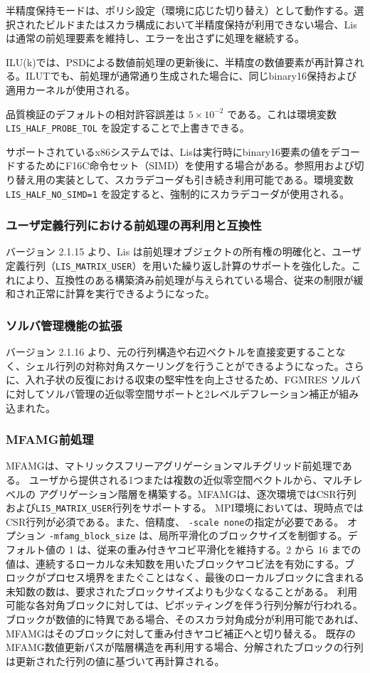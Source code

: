 \documentclass[a4paper]{jarticle}
\begin{document}
{{半精度保持モードは、ポリシ設定（環境に応じた切り替え）として動作する。選択されたビルドまたはスカラ構成において半精度保持が利用できない場合、Lisは通常の前処理要素を維持し、エラーを出さずに処理を継続する。

ILU(k)では、PSDによる数値前処理の更新後に、半精度の数値要素が再計算される。ILUTでも、前処理が通常通り生成された場合に、同じbinary16保持および適用カーネルが使用される。

品質検証のデフォルトの相対許容誤差は $5\times10^{-2}$ である。これは環境変数 \verb|LIS_HALF_PROBE_TOL| を設定することで上書きできる。

サポートされているx86システムでは、Lisは実行時にbinary16要素の値をデコードするためにF16C命令セット（SIMD）を使用する場合がある。参照用および切り替え用の実装として、スカラデコーダも引き続き利用可能である。環境変数 \verb|LIS_HALF_NO_SIMD=1| を設定すると、強制的にスカラデコーダが使用される。

\subsubsection{ユーザ定義行列における前処理の再利用と互換性}
バージョン 2.1.15 より、Lis は前処理オブジェクトの所有権の明確化と、ユーザ定義行列（\texttt{LIS\_MATRIX\_USER}）を用いた繰り返し計算のサポートを強化した。これにより、互換性のある構築済み前処理が与えられている場合、従来の制限が緩和され正常に計算を実行できるようになった。

\subsubsection{ソルバ管理機能の拡張}
バージョン 2.1.16 より、元の行列構造や右辺ベクトルを直接変更することなく、シェル行列の対称対角スケーリングを行うことができるようになった。さらに、入れ子状の反復における収束の堅牢性を向上させるため、FGMRES ソルバに対してソルバ管理の近似零空間サポートと2レベルデフレーション補正が組み込まれた。

\subsubsection{MFAMG前処理}
MFAMGは、マトリックスフリーアグリゲーションマルチグリッド前処理である。
ユーザから提供される1つまたは複数の近似零空間ベクトルから、マルチレベルの
アグリゲーション階層を構築する。MFAMGは、逐次環境ではCSR行列
および{\tt LIS\_MATRIX\_USER}行列をサポートする。
MPI環境においては、現時点ではCSR行列が必須である。また、倍精度、
\verb=-scale none=の指定が必要である。
オプション \verb=-mfamg_block_size= は、局所平滑化のブロックサイズを制御する。デフォルト値の 1 は、従来の重み付きヤコビ平滑化を維持する。2 から 16 までの値は、連続するローカルな未知数を用いたブロックヤコビ法を有効にする。ブロックがプロセス境界をまたぐことはなく、最後のローカルブロックに含まれる未知数の数は、要求されたブロックサイズよりも少なくなることがある。
利用可能な各対角ブロックに対しては、ピボッティングを伴う行列分解が行われる。ブロックが数値的に特異である場合、そのスカラ対角成分が利用可能であれば、MFAMGはそのブロックに対して重み付きヤコビ補正へと切り替える。
既存のMFAMG数値更新パスが階層構造を再利用する場合、分解されたブロックの行列は更新された行列の値に基づいて再計算される。

}}
\end{document}
